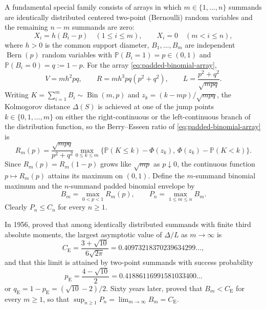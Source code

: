 \documentclass[11pt]{article}
\numberwithin{equation}{section}
\theoremstyle{definition}
\theoremstyle{remark}
\DeclareMathOperator{\Bern}{Bern}
\DeclareMathOperator{\Bin}{Bin}
\newcommand{\Pp}{\mathbb P}
\newcommand{\ce}{C_{\mathrm E}}
\newcommand{\pe}{p_{\mathrm E}}
\newcommand{\qe}{q_{\mathrm E}}
\begin{document}
A fundamental special family consists of arrays in which $m\in\{1,\ldots,n\}$
summands are identically distributed centered two-point (Bernoulli) random
variables and the remaining $n-m$ summands are zero:
\begin{equation}\label{eq:padded-binomial-array}
 X_i=h(B_i-p)\quad(1\le i\le m),\qquad
 X_i=0\quad(m<i\le n),
\end{equation}
where $h>0$ is the common support diameter, $B_1,\ldots,B_m$ are independent
$\Bern(p)$ random variables with $\Pp(B_i=1)=p\in(0,1)$ and
$\Pp(B_i=0)=q:=1-p$. For the array \eqref{eq:padded-binomial-array},
\[
 V=mh^2pq,\qquad
 R=mh^3pq(p^2+q^2),\qquad
 L=\frac{p^2+q^2}{\sqrt{mpq}}.
\]
Writing $K=\sum_{i=1}^m B_i\sim\Bin(m,p)$ and $z_k=(k-mp)/\sqrt{mpq}$, the
Kolmogorov distance $\Delta(S)$ is achieved at one of the jump points
$k\in\{0,1,\ldots,m\}$ on either the right-continuous or the left-continuous
branch of the distribution function, so the Berry--Esseen ratio of
\eqref{eq:padded-binomial-array} is
\begin{equation}\label{eq:rmp}
 R_m(p)=\frac{\sqrt{mpq}}{p^2+q^2}
 \max_{0\le k\le m}\bigl\{\Pp(K\le k)-\Phi(z_k),\,\Phi(z_k)-\Pp(K<k)\bigr\}.
\end{equation}
Since $R_m(p)=R_m(1-p)$ grows like $\sqrt{mp}$ as $p\downarrow0$, the
continuous function $p\mapsto R_m(p)$ attains its maximum on $(0,1)$. Define
the $m$-summand binomial maximum and the $n$-summand padded binomial envelope
by
\begin{equation}\label{eq:bm-pn}
 B_m=\max_{0<p<1}R_m(p),\qquad
 P_n=\max_{1\le m\le n}B_m.
\end{equation}
Clearly $P_n\le C_n$ for every $n\ge1$.

In 1956, \citet{Esseen1956} proved that among identically distributed
summands with finite third absolute moments, the largest asymptotic value of
$\Delta/L$ as $m\to\infty$ is
\begin{equation}\label{eq:esseen-constants}
 \ce=\frac{3+\sqrt{10}}{6\sqrt{2\pi}}=0.40973218370239634299\ldots,
\end{equation}
and that this limit is attained by two-point summands with success
probability
\begin{equation}\label{eq:esseen-probability}
 \pe=\frac{4-\sqrt{10}}{2}=0.41886116991581033400\ldots
\end{equation}
or $\qe=1-\pe=( \sqrt{10}-2)/2$. Sixty years later, \citet[Theorem~1]{Schulz2016}
proved that $B_m<\ce$ for every $m\ge1$, so that $\sup_{n\ge1}P_n=\lim_{m\to\infty}B_m=\ce$.
\end{document}
